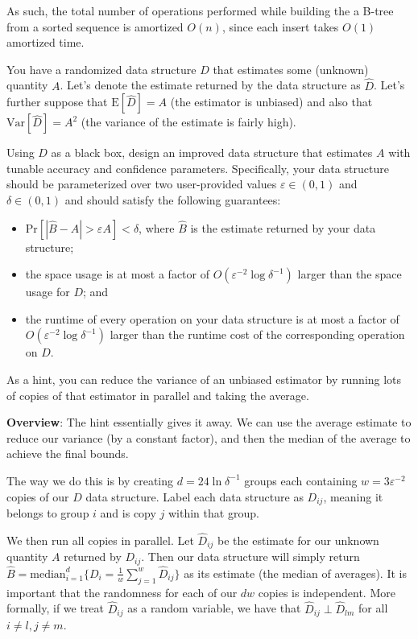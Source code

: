 \documentclass[12pt]{exam}
\newcommand{\Q}[1]{\question{\large{\textbf{#1}}}}
\newcommand*{\bigo}[1]{O \left( #1 \right)}
\newcommand*{\prob}[1]{\text{Pr} \left[ #1 \right]}
\newcommand*{\ex}[1]{\text{E} \left[ #1 \right]}
\newcommand*{\var}[1]{\text{Var} \left[ #1 \right]}
\newcommand*{\eps}{\varepsilon}  %
\begin{document}
\begin{questions}
\begin{solution}
As such, the total number of operations performed while building the a B-tree from a sorted sequence is amortized $\bigo{n}$, since each insert takes $\bigo{1}$  amortized time.
\end{solution}

\newpage
\Q{Problem Five: Randomization}

You have a randomized data structure $D$ that estimates some (unknown) quantity $A$. Let's denote the estimate returned by the data structure as $\hat{D}$. Let's further suppose that $\ex{\hat{D}} = A$ (the estimator is unbiased) and also that $\var{\hat{D}} = A^2$ (the variance of the estimate is fairly high).

Using $D$ as a black box, design an improved data structure that estimates $A$ with tunable accuracy and confidence parameters. Specifically, your data structure should be parameterized over two user-provided values $\varepsilon \in (0, 1)$ and $\delta \in (0, 1)$ and should satisfy the following guarantees:
\begin{itemize}
    \item $\prob{|\hat{B} - A| > \varepsilon A} < \delta$, where $\hat{B}$ is the estimate returned by your data structure;
    \item the space usage is at most a factor of $O(\varepsilon^{-2} \log \delta^{-1})$ larger than the space usage for $D$; and
    \item the runtime of every operation on your data structure is at most a factor of $O(\varepsilon^{-2} \log \delta^{-1})$ larger than the runtime cost of the corresponding operation on $D$.
\end{itemize}
As a hint, you can reduce the variance of an unbiased estimator by running lots of copies of that estimator in parallel and taking the average.

\begin{solution}

\textbf{Overview}: 
The hint essentially gives it away. We can use the average estimate to reduce our variance (by a constant factor), and then the median of the average to achieve the final bounds.

The way we do this is by creating $d = 24 \ln \delta^{-1}$ groups each containing $w = 3 \eps^{-2}$ copies of our $D$ data structure. Label each data structure as $D_{ij}$, meaning it belongs to group $i$ and is copy $j$ within that group.

We then run all copies in parallel. Let $\hat{D}_{ij}$ be the estimate for our unknown quantity $A$ returned by $D_{ij}$. Then our data structure will simply return $\hat{B} =\text{median}_{i=1}^d \{ D_i = \frac{1}{w} \sum_{j=1}^{w} \hat{D}_{ij} \}$ as its estimate (the median of averages). It is important that the randomness for each of our $dw$ copies is independent. More formally, if we treat $\hat{D}_{ij}$ as a random variable, we have that $\hat{D}_{ij} \perp \hat{D}_{lm}$ for all $i \neq l, j \neq m$.


\end{solution}
\end{questions}
\end{document}

